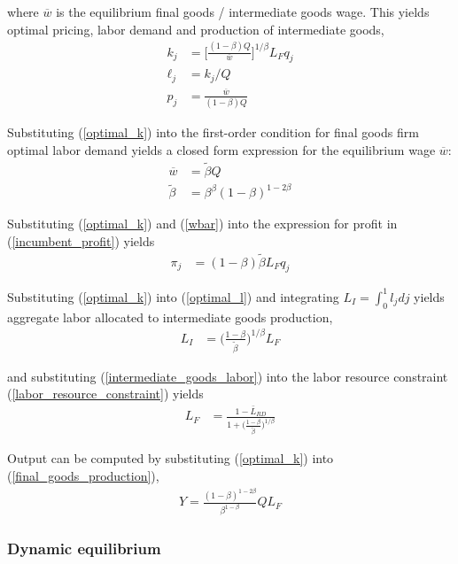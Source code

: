 \documentclass[11pt,english]{article}
\begin{document}
where $\overline{w}$ is the equilibrium final goods / intermediate goods wage.
This yields optimal pricing, labor demand and production of intermediate goods,
\begin{align}
k_j &= \Big[ \frac{(1-\beta) Q}{\overline{w}} \Big]^{1/\beta}L_F q_j  \label{optimal_k}\\
\ell_j &= k_j / Q \label{optimal_l}\\
p_j &= \frac{\overline{w}}{(1-\beta) Q} \label{optimal_p}
\end{align}

Substituting (\ref{optimal_k}) into the first-order condition for final goods firm optimal labor demand yields a closed form expression for the equilibrium wage $\overline{w}$:
\begin{align}
\overline{w} &= \tilde{\beta} Q \label{wbar} \\
\tilde{\beta} &= \beta^{\beta} (1-\beta)^{1-2\beta} \label{def_cbeta}
\end{align}

Substituting (\ref{optimal_k}) and (\ref{wbar}) into the expression for profit in (\ref{incumbent_profit}) yields
\begin{align}
\pi_j &= (1-\beta) \tilde{\beta} L_F q_j \label{profits_eq}
\end{align}

Substituting (\ref{optimal_k}) into (\ref{optimal_l}) and integrating $L_I = \int_0^1 l_j dj$ yields aggregate labor allocated to intermediate goods production,
\begin{align}
L_I &= \Big( \frac{1-\beta}{\tilde{\beta}} \Big)^{1 / \beta} L_F \label{intermediate_goods_labor}
\end{align}

and substituting (\ref{intermediate_goods_labor}) into the labor resource constraint (\ref{labor_resource_constraint}) yields
\begin{align}
L_F &= \frac{1 - \bar{L}_{RD}}{1 + \Big(\frac{1-\beta}{\tilde{\beta}}\Big)^{1/\beta}}
\end{align}

Output can be computed by substituting (\ref{optimal_k}) into (\ref{final_goods_production}), 
\begin{align}
Y = \frac{(1-\beta)^{1-2\beta}}{\beta^{1-\beta}} Q L_F \label{flow_output}
\end{align}

\subsubsection{Dynamic equilibrium}\label{subsubsec:dynamic_equilibrium_original_solution}
\end{document}
